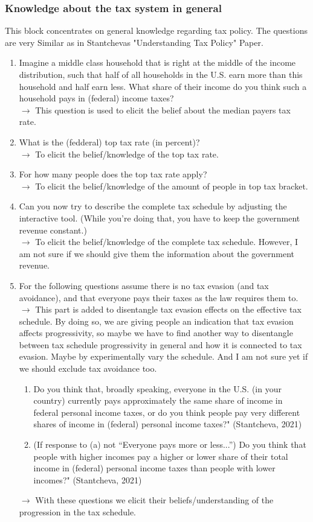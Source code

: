 \documentclass[12pt]{article}
\begin{document}
\subsubsection{Knowledge about the tax system in general}
This block concentrates on general knowledge regarding tax policy. The questions are very Similar as in Stantchevas "Understanding Tax Policy" Paper. 
\begin{enumerate}
    \item Imagine a middle class household that is right at the middle of the income distribution, such that half of all households in the U.S. earn more than this household and half earn less. What share of their income do you think such a household pays in (federal) income taxes? \\
    $\rightarrow$ This question is used to elicit the belief about the median payers tax rate.
    \item What is the (fedderal) top tax rate (in percent)? \\
    $\rightarrow$ To elicit the belief/knowledge of the top tax rate. 
    \item For how many people does the top tax rate apply? \\
    $\rightarrow$ To elicit the belief/knowledge of the amount of people in top tax bracket. 
    \item Can you now try to describe the complete tax schedule by adjusting the interactive tool. (While you're doing that, you have to keep the government revenue constant.) \\
    $\rightarrow$ To elicit the belief/knowledge of the complete tax schedule. However, I am not sure if we should give them the information about the government revenue.  
    \item For the following questions assume there is no tax evasion (and tax avoidance), and that everyone pays their taxes as the law requires them to. \\
    $\rightarrow$ This part is added to disentangle tax evasion effects on the effective tax schedule. By doing so, we are giving people an indication that tax evasion affects progressivity, so maybe we have to find another way to disentangle between tax schedule progressivity in general and how it is connected to tax evasion. Maybe by experimentally vary the schedule. And I am not sure yet if we should exclude tax avoidance too. 
    \begin{enumerate}
        \item Do you think that, broadly speaking, everyone in the U.S. (in your country) currently pays approximately the same share of income in federal personal income taxes, or do you think people pay very different shares of income in (federal) personal income taxes?" (Stantcheva, 2021)
        \item (If response to (a) not “Everyone pays more or less...”) Do you think that people with higher incomes pay a higher or lower share of their total income in (federal) personal income taxes than people with lower incomes?" (Stantcheva, 2021)
    \end{enumerate} $\rightarrow$ With these questions we elicit their beliefs/understanding of the progression in the tax schedule. 
\end{enumerate}
\end{document}
